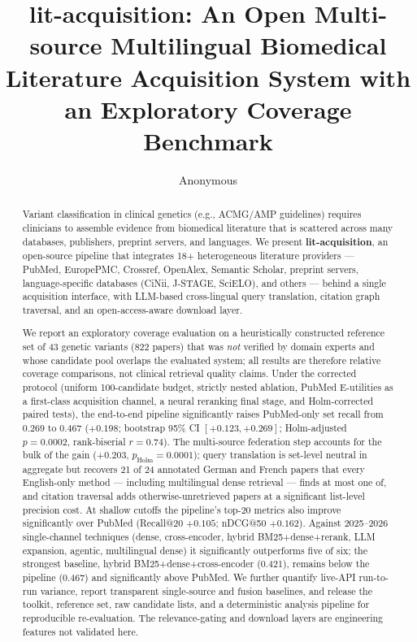 \documentclass[sigconf,screen]{acmart}
\begin{document}
\title{lit-acquisition: An Open Multi-source Multilingual Biomedical
Literature Acquisition System with an Exploratory Coverage Benchmark}

\author{Anonymous}

\renewcommand{\shortauthors}{Anonymous et al.}

\begin{abstract}
Variant classification in clinical genetics (e.g., ACMG/AMP guidelines)
requires clinicians to assemble evidence from biomedical literature that is
scattered across many databases, publishers, preprint servers, and languages.
We present \textbf{lit-acquisition}, an open-source pipeline that integrates
18+ heterogeneous literature providers --- PubMed, EuropePMC, Crossref,
OpenAlex, Semantic Scholar, preprint servers, language-specific databases
(CiNii, J-STAGE, SciELO), and others --- behind a single acquisition
interface, with LLM-based cross-lingual query translation, citation graph
traversal, and an open-access-aware download layer.

We report an exploratory coverage evaluation on a heuristically constructed
reference set of 43 genetic variants (822 papers) that was \emph{not}
verified by domain experts and whose candidate pool overlaps the evaluated
system; all results are therefore relative coverage comparisons, not
clinical retrieval quality claims. Under the corrected protocol (uniform
100-candidate budget, strictly nested ablation, PubMed E-utilities as a
first-class acquisition channel, a neural reranking final stage, and
Holm-corrected paired tests), the end-to-end pipeline significantly
raises PubMed-only set recall from 0.269 to 0.467 ($+0.198$; bootstrap
95\% CI $[+0.123, +0.269]$; Holm-adjusted $p{=}0.0002$, rank-biserial
$r{=}0.74$). The multi-source federation step accounts for the bulk of
the gain ($+0.203$, $p_{\text{Holm}}{=}0.0001$); query translation is
set-level neutral in aggregate but recovers 21 of 24 annotated German and
French papers that every English-only method --- including multilingual
dense retrieval --- finds at most one of, and citation traversal adds
otherwise-unretrieved papers at a significant list-level precision cost.
At shallow cutoffs the pipeline's top-20 metrics also improve
significantly over PubMed (Recall@20 $+0.105$; nDCG@50 $+0.162$). Against
2025--2026 single-channel techniques (dense, cross-encoder,
hybrid BM25+dense+rerank, LLM expansion, agentic, multilingual dense) it
significantly outperforms five of six; the strongest baseline, hybrid
BM25+dense+cross-encoder (0.421), remains below the pipeline (0.467) and
significantly above PubMed. We further quantify live-API run-to-run
variance, report transparent single-source and fusion baselines, and
release the toolkit, reference set, raw candidate lists, and a
deterministic analysis pipeline for reproducible re-evaluation. The
relevance-gating and download layers are engineering features not
validated here.
\end{abstract}
\end{document}
